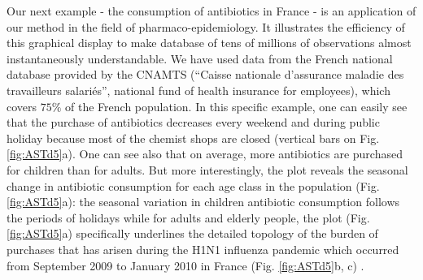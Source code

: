 Our next example - the consumption of antibiotics in France - is an application
of our method in the field of pharmaco-epidemiology. It illustrates the
efficiency of this graphical display to make database of tens of millions of
observations almost instantaneously understandable. We have used data from the
French national database provided by the CNAMTS (“Caisse nationale d’assurance
maladie des travailleurs salariés”, national fund of health insurance for
employees), which covers $75\%$ of the French population. In this specific
example, one can easily see that the purchase of antibiotics decreases every
weekend and during public holiday because most of the chemist shops are closed
(vertical bars on Fig. \ref{fig:ASTd5}a). One can see also that on average, more
antibiotics are purchased for children than for adults. But more interestingly,
the plot reveals the seasonal change in antibiotic consumption for each age
class in the population (Fig. \ref{fig:ASTd5}a): the seasonal variation in
children antibiotic consumption follows the periods of holidays while for adults
and elderly people, the plot (Fig. \ref{fig:ASTd5}a) specifically underlines the detailed
topology of the burden of purchases that has arisen during the H1N1 influenza
pandemic which occurred from September 2009 to January 2010 in France (Fig.
\ref{fig:ASTd5}b, c) \autocites{lemaitre2010a,lemaitre2012a}.

